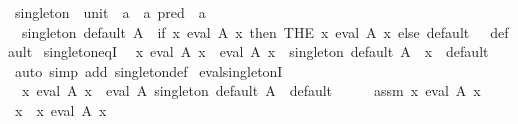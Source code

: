 \begin{isabellebody}
\endisatagproof
{\isafoldproof}%
%
\isadelimproof
\isanewline
%
\endisadelimproof
\isanewline
{}\isamarkupfalse%
\ singleton\ {\isacharcolon}{\kern0pt}{\isacharcolon}{\kern0pt}\ {\isachardoublequoteopen}{\isacharparenleft}{\kern0pt}unit\ {\isasymRightarrow}\ {\isacharprime}{\kern0pt}a{\isacharparenright}{\kern0pt}\ {\isasymRightarrow}\ {\isacharprime}{\kern0pt}a\ pred\ {\isasymRightarrow}\ {\isacharprime}{\kern0pt}a{\isachardoublequoteclose}\ \isanewline
\ \ {\isachardoublequoteopen}singleton\ default\ A\ {\isacharequal}{\kern0pt}\ {\isacharparenleft}{\kern0pt}if\ {\isasymexists}{\isacharbang}{\kern0pt}x{\isachardot}{\kern0pt}\ eval\ A\ x\ then\ THE\ x{\isachardot}{\kern0pt}\ eval\ A\ x\ else\ default\ {\isacharparenleft}{\kern0pt}{\isacharparenright}{\kern0pt}{\isacharparenright}{\kern0pt}{\isachardoublequoteclose}\ \ default\isanewline
\isanewline
{}\isamarkupfalse%
\ singleton{\isacharunderscore}{\kern0pt}eqI{\isacharcolon}{\kern0pt}\isanewline
\ \ {\isachardoublequoteopen}{\isasymexists}{\isacharbang}{\kern0pt}x{\isachardot}{\kern0pt}\ eval\ A\ x\ {\isasymLongrightarrow}\ eval\ A\ x\ {\isasymLongrightarrow}\ singleton\ default\ A\ {\isacharequal}{\kern0pt}\ x{\isachardoublequoteclose}\ \ default\isanewline
%
\isadelimproof
\ \ %
\endisadelimproof
%
\isatagproof
{}\isamarkupfalse%
\ {\isacharparenleft}{\kern0pt}auto\ simp\ add{\isacharcolon}{\kern0pt}\ singleton{\isacharunderscore}{\kern0pt}def{\isacharparenright}{\kern0pt}%
\endisatagproof
{\isafoldproof}%
%
\isadelimproof
\isanewline
%
\endisadelimproof
\isanewline
{}\isamarkupfalse%
\ eval{\isacharunderscore}{\kern0pt}singletonI{\isacharcolon}{\kern0pt}\isanewline
\ \ {\isachardoublequoteopen}{\isasymexists}{\isacharbang}{\kern0pt}x{\isachardot}{\kern0pt}\ eval\ A\ x\ {\isasymLongrightarrow}\ eval\ A\ {\isacharparenleft}{\kern0pt}singleton\ default\ A{\isacharparenright}{\kern0pt}{\isachardoublequoteclose}\ \ default\isanewline
%
\isadelimproof
%
\endisadelimproof
%
\isatagproof
{}\isamarkupfalse%
\ {\isacharminus}{\kern0pt}\isanewline
\ \ \isamarkupfalse%
\ assm{\isacharcolon}{\kern0pt}\ {\isachardoublequoteopen}{\isasymexists}{\isacharbang}{\kern0pt}x{\isachardot}{\kern0pt}\ eval\ A\ x{\isachardoublequoteclose}\isanewline
\ \ \isamarkupfalse%
\ \isamarkupfalse%
\ x\ \ x{\isacharcolon}{\kern0pt}\ {\isachardoublequoteopen}eval\ A\ x{\isachardoublequoteclose}\ \isacommand{{\isachardot}{\kern0pt}{\isachardot}{\kern0pt}}\isamarkupfalse%

\end{isabellebody}
